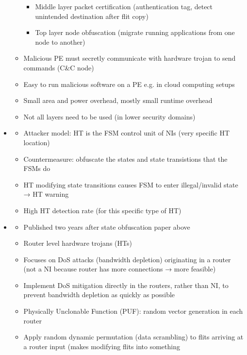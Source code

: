 \begin{itemize}
\begin{itemize}
\begin{itemize}
                    \item Middle layer packet certification (authentication tag, detect unintended destination after flit copy)
                    \item Top layer node obfuscation (migrate running applications from one node to another)
                \end{itemize}
            \item Malicious PE must secretly communicate with hardware trojan to send commands (C\&C node)
            \item Easy to run malicious software on a PE e.g. in cloud computing setups
            \item Small area and power overhead, mostly small runtime overhead
            \item Not all layers need to be used (in lower security domains)
        \end{itemize}
    \item \textbf{}
        \begin{itemize}
            \item Attacker model: HT is the FSM control unit of NIs (very specific HT location)
            \item Countermeasure: obfuscate the states and state transistions that the FSMs do
            \item HT modifying state transitions causes FSM to enter illegal/invalid state → HT warning
            \item High HT detection rate (for this specific type of HT)
        \end{itemize}
    \item \textbf{}
        \begin{itemize}
            \item Published two years after state obfuscation paper above
            \item Router level hardware trojans (HTs)
            \item Focuses on DoS attacks (bandwidth depletion) originating in a router (not a NI because router has more connections → more
                feasible)
            \item Implement DoS mitigation directly in the routers, rather than NI, to prevent bandwidth depletion as quickly as possible
            \item Physically Unclonable Function (PUF): random vector generation in each router
            \item Apply random dynamic permutation (data scrambling) to flits arriving at a router input (makes modifying flits into something

\end{itemize}
\end{itemize}
